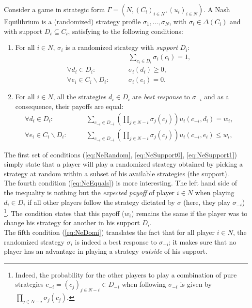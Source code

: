 \begin{definition}
Consider a game in strategic form $\Gamma = \left (N, (C_i)_{i \in N}, (u_i)_{i \in N} \right).$  A Nash Equilibrium is a (randomized) strategy profile $\sigma_1, \ldots, \sigma_N$, with $\sigma_i \in \Delta(C_i)$ and with support $D_i \subseteq C_i$, satisfying to the following conditions:
\begin{enumerate}
\item For all $i \in N$, $\sigma_i$ is a randomized strategy with \emph{support} $D_i$:
\begin{align}
& \qquad \sum_{c_i \in D_i} \sigma_i(c_i) = 1,&
\label{eq:NeRandom}\\
\forall d_i \in D_i:  &\qquad \sigma_i(d_i) \geq 0, &
\label{eq:NeSupport0} \\
\forall e_i \in C_i \backslash D_i: & \qquad\sigma_i(e_i) = 0.  &
\label{eq:NeSupport1}
\end{align}
\item For all $i \in  N$,  all the strategies $d_i \in D_i$ are \emph{best response} to $\sigma_{-i}$ and as a consequence, their payoffs are equal:
\begin{align}
\forall d_i \in D_i: & \qquad  \sum_{c_{-i} \in D_{-i}} \left  ( \prod_{j \in N-i} \sigma_j(c_j) \right ) u_i(c_{-i}, d_i) = w_i, &
\label{eq:NeEquals} \\
\forall e_i \in C_i \backslash D_i: & \qquad \sum_{c_{-i} \in D_{-i}} \left  ( \prod_{j \in N-i} \sigma_j(c_j) \right ) u_i(c_{-i}, e_i) \leq w_i, &
\label{eq:NeDomi}
\end{align}
\end{enumerate}
\label{def:nash}
\end{definition}

The first set of conditions (\ref{eq:NeRandom}, \ref{eq:NeSupport0}, \ref{eq:NeSupport1}) simply state that a player will play a randomized strategy obtained by picking a strategy at random within a subset of his available strategies (the support). \\
The fourth condition (\ref{eq:NeEquals}) is more interesting. The left hand side of the inequality is nothing but the \emph{expected payoff} of player $i \in N$ when playing $d_i \in D_i$ if all other players follow the strategy dictated by $\sigma$ (here, they play $\sigma_{-i}$) \footnote{Indeed, the probability for the other players to play a combination of pure strategies $c_{-i} = (c_j)_{j \in N-i} \in D_{-i}$ when following $\sigma_{-i}$ is given by $\prod_{j \in N-i} \sigma_j(c_j).$ }.
The condition states that this payoff ($w_i$) remains the same if the player was to change his strategy for another in his support $D_i$.\\
The fifth condition (\ref{eq:NeDomi}) translates the fact that for all player $i \in N$, the randomized strategy $\sigma_{i}$ is indeed a best response to $\sigma_{-i}$; it makes sure that no player has an advantage in playing a strategy \emph{outside} of his support.


